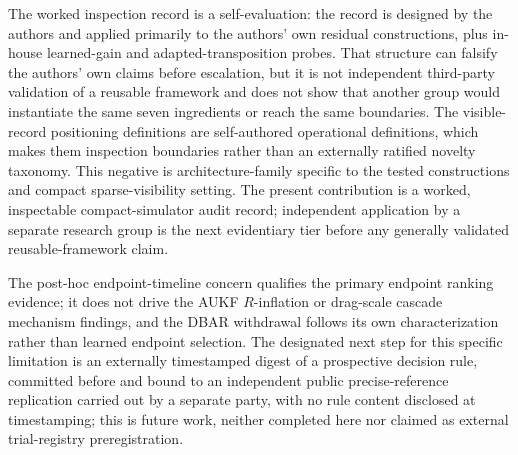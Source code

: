 \documentclass{article}
\begin{document}
The worked inspection record is a self-evaluation: the record is designed by the authors and applied primarily to the authors' own residual constructions, plus in-house learned-gain and adapted-transposition probes. That structure can falsify the authors' own claims before escalation, but it is not independent third-party validation of a reusable framework and does not show that another group would instantiate the same seven ingredients or reach the same boundaries. The visible-record positioning definitions are self-authored operational definitions, which makes them inspection boundaries rather than an externally ratified novelty taxonomy. This negative is architecture-family specific to the tested constructions and compact sparse-visibility setting. The present contribution is a worked, inspectable compact-simulator audit record; independent application by a separate research group is the next evidentiary tier before any generally validated reusable-framework claim.

The post-hoc endpoint-timeline concern qualifies the primary endpoint ranking evidence; it does not drive the AUKF \(R\)-inflation or drag-scale cascade mechanism findings, and the DBAR withdrawal follows its own characterization rather than learned endpoint selection. The designated next step for this specific limitation is an externally timestamped digest of a prospective decision rule, committed before and bound to an independent public precise-reference replication carried out by a separate party, with no rule content disclosed at timestamping; this is future work, neither completed here nor claimed as external trial-registry preregistration.
\end{document}
